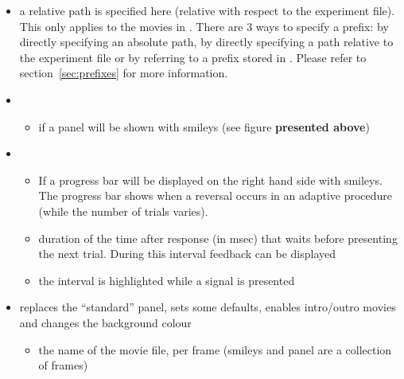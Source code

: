 \begin{itemize}
\item {} a relative path is specified here
(relative with respect to the experiment file). This only applies
to the movies in . There are 3 ways to specify a
prefix: by directly specifying an absolute path, by directly
specifying a path relative to the experiment file or by referring
to a prefix stored in . Please refer to
section~\ref{sec:prefixes} for more information.

\item {}

\begin{itemize}

\item {} if  a panel will be shown
with smileys (see figure \textbf{presented above})

\end{itemize}

\item {}
\begin{itemize}
\item {} If  a progress bar will be
displayed on the right hand side with smileys. The progress bar
shows when a reversal occurs in an adaptive procedure (while the
number of trials varies).

\item {} duration of the time after
response (in msec) that \apex waits before presenting the next
trial. During this interval feedback can be displayed

\item {} the interval is highlighted while a
signal is presented

\end{itemize}

\item{} replaces the ``standard'' panel, sets
some defaults, enables intro/outro movies and changes the
background colour

\begin{itemize}

\item {} the name of the movie file, per frame
(smileys and panel are a collection of frames)

\end{itemize}

\end{itemize}

